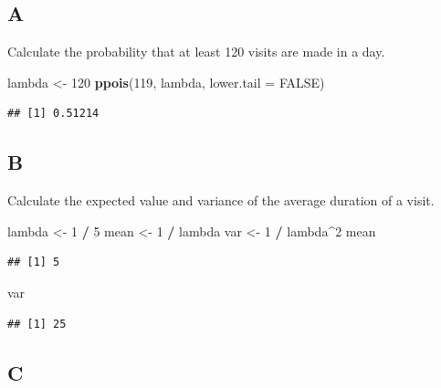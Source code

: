 \documentclass[
]{article}
\newenvironment{Shaded}{\begin{snugshade}}{\end{snugshade}}
\newcommand{\DataTypeTok}[1]{\textcolor[rgb]{0.13,0.29,0.53}{#1}}
\newcommand{\DecValTok}[1]{\textcolor[rgb]{0.00,0.00,0.81}{#1}}
\newcommand{\KeywordTok}[1]{\textcolor[rgb]{0.13,0.29,0.53}{\textbf{#1}}}
\newcommand{\NormalTok}[1]{#1}
\newcommand{\OperatorTok}[1]{\textcolor[rgb]{0.81,0.36,0.00}{\textbf{#1}}}
\newcommand{\OtherTok}[1]{\textcolor[rgb]{0.56,0.35,0.01}{#1}}
\newcommand{\StringTok}[1]{\textcolor[rgb]{0.31,0.60,0.02}{#1}}
\begin{document}
\hypertarget{a-3}{%
\subsection{A}\label{a-3}}

Calculate the probability that at least 120 visits are made in a day.

\begin{Shaded}
\begin{Highlighting}[]
\NormalTok{lambda \textless{}{-}}\StringTok{ }\DecValTok{120}
\KeywordTok{ppois}\NormalTok{(}\DecValTok{119}\NormalTok{, lambda, }\DataTypeTok{lower.tail =} \OtherTok{FALSE}\NormalTok{)}
\end{Highlighting}
\end{Shaded}

\begin{verbatim}
## [1] 0.51214
\end{verbatim}

\hypertarget{b-3}{%
\subsection{B}\label{b-3}}

Calculate the expected value and variance of the average duration of a
visit.

\begin{Shaded}
\begin{Highlighting}[]
\NormalTok{lambda \textless{}{-}}\StringTok{ }\DecValTok{1} \OperatorTok{/}\StringTok{ }\DecValTok{5}
\NormalTok{mean \textless{}{-}}\StringTok{ }\DecValTok{1} \OperatorTok{/}\StringTok{ }\NormalTok{lambda}
\NormalTok{var \textless{}{-}}\StringTok{ }\DecValTok{1} \OperatorTok{/}\StringTok{ }\NormalTok{lambda}\OperatorTok{\^{}}\DecValTok{2}
\NormalTok{mean}
\end{Highlighting}
\end{Shaded}

\begin{verbatim}
## [1] 5
\end{verbatim}

\begin{Shaded}
\begin{Highlighting}[]
\NormalTok{var}
\end{Highlighting}
\end{Shaded}

\begin{verbatim}
## [1] 25
\end{verbatim}

\hypertarget{c-3}{%
\subsection{C}\label{c-3}}
\end{document}
